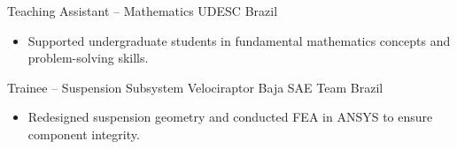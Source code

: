   {Teaching Assistant -- Mathematics}
  {UDESC}
  {Brazil}
  {}
  {
    \begin{itemize}
      \item Supported undergraduate students in fundamental mathematics concepts and problem-solving skills.
    \end{itemize}
  }

  {Trainee -- Suspension Subsystem}
  {Velociraptor Baja SAE Team}
  {Brazil}
  {}
  {
    \begin{itemize}
      \item Redesigned suspension geometry and conducted FEA in ANSYS to ensure component integrity.
    \end{itemize}
  }